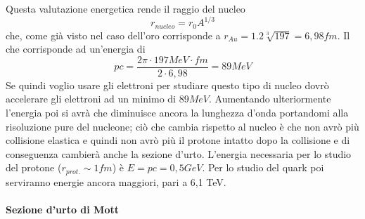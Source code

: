 Questa valutazione energetica rende il raggio del nucleo
\begin{equation}
r_{nucleo}=r_0A^{1/3}
\end{equation}
che, come già visto nel caso dell'oro corrisponde a $r_{Au}=1.2\sqrt[3]{197}=6,98 fm$.
Il che corrisponde ad un'energia di
\begin{equation}
pc=\frac{2\pi\cdot 197MeV\cdot fm}{2\cdot6,98}=89MeV
\end{equation}
Se quindi voglio usare gli elettroni per studiare questo tipo di nucleo dovrò accelerare gli elettroni ad un minimo di $89 MeV$.
Aumentando ulteriormente l'energia poi si avrà che diminuisce ancora la lunghezza d'onda portandomi alla risoluzione pure del nucleone;
ciò che cambia rispetto al nucleo è che non avrò più collisione elastica e quindi non avrò più il protone intatto dopo la collisione e di conseguenza cambierà anche la sezione d'urto.
L'energia necessaria per lo studio del protone ($r_{prot.}\sim 1fm$) è $E=pc=0,5GeV$.
Per lo studio del quark poi serviranno energie ancora maggiori, pari a 6,1 TeV.

\paragraph{Sezione d'urto di Mott}

